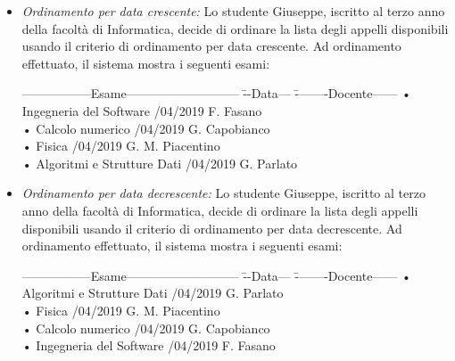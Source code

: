 \begin{itemize}
	\item \textit{Ordinamento per data crescente:}
	Lo studente Giuseppe, iscritto al terzo anno della facoltà di Informatica, decide di ordinare la lista degli appelli disponibili usando il criterio di ordinamento per data crescente. Ad ordinamento effettuato, il sistema mostra i seguenti esami:
	\begin{tabbing}
		\hspace{1cm}-----------------Esame--------------------------- \= --Data--- \= --------Docente------ \kill
		\hspace{1cm} • Ingegneria del Software /04/2019   \> \hspace{1cm} F. Fasano \\
		\hspace{1cm} • Calcolo numerico /04/2019  \> \hspace{1cm} G. Capobianco \\
		\hspace{1cm} • Fisica /04/2019 \> \hspace{1cm} G. M. Piacentino  \\
		\hspace{1cm} • Algoritmi e Strutture Dati /04/2019 \> \hspace{1cm} G. Parlato \\
	\end{tabbing} 
	
	\item \textit{Ordinamento per data decrescente:}
	Lo studente Giuseppe, iscritto al terzo anno della facoltà di Informatica, decide di ordinare la lista degli appelli disponibili usando il criterio di ordinamento per data decrescente. Ad ordinamento effettuato, il sistema mostra i seguenti esami:
	\begin{tabbing}
		\hspace{1cm}-----------------Esame--------------------------- \= --Data--- \= --------Docente------ \kill
		\hspace{1cm} • Algoritmi e Strutture Dati /04/2019 \> \hspace{1cm} G. Parlato \\
		\hspace{1cm} • Fisica /04/2019 \> \hspace{1cm} G. M. Piacentino  \\
		\hspace{1cm} • Calcolo numerico /04/2019  \> \hspace{1cm} G. Capobianco \\
		\hspace{1cm} • Ingegneria del Software /04/2019   \> \hspace{1cm} F. Fasano \\
	\end{tabbing} 
	

\end{itemize}
